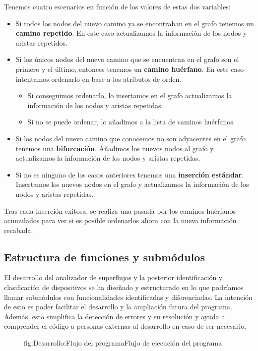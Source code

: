 \documentclass[tfg,epsbased,lof,lot,loa,covers,final,copyright,overleaf]{tfgtfmthesisuam}
\begin{document}
Tenemos cuatro escenarios en función de los valores de estas dos variables:
\begin{itemize}
    \item Si todos los nodos del nuevo camino ya se encontraban en el grafo tenemos un \textbf{camino repetido}. En este caso actualizamos la información de los nodos y aristas repetidos.
    \item Si los únicos nodos del nuevo camino que se encuentran en el grafo son el primero y el último, entonces tenemos un \textbf{camino huérfano}. En este caso intentamos ordenarlo en base a los atributos de orden.
    \begin{itemize}
        \item Si conseguimos ordenarlo, lo insertamos en el grafo actualizamos la información de los nodos y aristas repetidas.
        \item Si no se puede ordenar, lo añadimos a la lista de caminos huérfanos.
    \end{itemize}
    \item Si los nodos del nuevo camino que conocemos no son adyacentes en el grafo tenemos una \textbf{bifurcación}. Añadimos los nuevos nodos al grafo y actualizamos la información de los nodos y aristas repetidas.
    \item Si no es ninguno de los casos anteriores tenemos una \textbf{inserción estándar}. Insertamos los nuevos nodos en el grafo y actualizamos la información de los nodos y aristas repetidas.
\end{itemize}
Tras cada inserción exitosa, se realiza una pasada por los caminos huérfanos acumulados para ver si es posible ordenarlos ahora con la nueva información recabada.

\subsection{Estructura de funciones y submódulos}
\label{subsec:Desarrollo:Ordenacion:EstructuraFunciones}
El desarrollo del analizador de superflujos y la posterior identificación y clasificación de dispositivos se ha diseñado y estructurado en lo que podríamos llamar submódulos con funcionalidades identificadas y diferenciadas. La intención de esto es poder facilitar el desarrollo y la ampliación futura del programa. Además, esto simplifica la detección de errores y su resolución y ayuda a comprender el código a personas externas al desarrollo en caso de ser necesario.

\begin{figure}[Flujo del programa]{fig:Desarrollo:Flujo del programa}{Flujo de ejecución del programa}

\end{figure}
\end{document}
